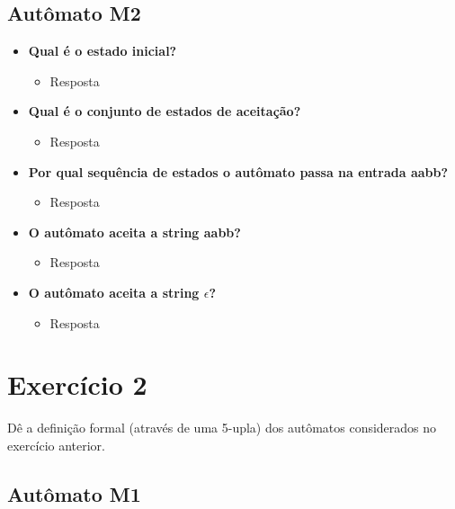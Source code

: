 \documentclass[a4paper, 12pt]{article}
\begin{document}
\subsection{Autômato M2}
\begin{itemize}
    \item \textbf{Qual é o estado inicial?}
    \begin{itemize}
        \item Resposta
    \end{itemize}
    
    
    \item \textbf{Qual é o conjunto de estados de aceitação?}
    \begin{itemize}
        \item Resposta
    \end{itemize}
    
    
    \item \textbf{Por qual sequência de estados o autômato passa na entrada aabb?}
    \begin{itemize}
        \item Resposta
    \end{itemize}
    
    
    \item \textbf{O autômato aceita a string aabb?}
    \begin{itemize}
        \item Resposta
    \end{itemize}
    
    
    \item \textbf{O autômato aceita a string $\epsilon$?}
    \begin{itemize}
        \item Resposta
    \end{itemize}
\end{itemize}

\newpage
\section{Exercício 2}

Dê a definição formal (através de uma 5-upla) dos autômatos considerados no exercício anterior.

\subsection{Autômato M1}
\end{document}

